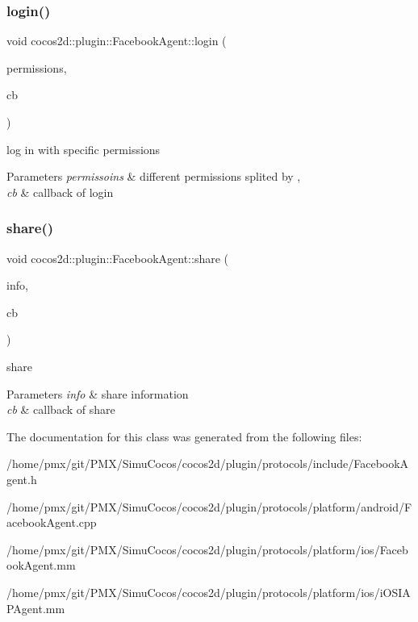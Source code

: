 \subsubsection{\texorpdfstring{login()}{login()}\hspace{0.1cm}{\footnotesize\ttfamily [2/2]}}
{\footnotesize\ttfamily void cocos2d\+::plugin\+::\+Facebook\+Agent\+::login (\begin{DoxyParamCaption}\item[{std\+::string \&}]{permissions,  }\item[{F\+B\+Callback}]{cb }\end{DoxyParamCaption})}



log in with specific permissions 


\begin{DoxyParams}{Parameters}
{\em permissoins} & different permissions splited by \textquotesingle{},\textquotesingle{} \\
\hline
{\em cb} & callback of login \\
\hline
\end{DoxyParams}
\mbox{\label{classcocos2d_1_1plugin_1_1FacebookAgent_aff75e3af70dfc31c20c32d8545cd5606}} 
\subsubsection{\texorpdfstring{share()}{share()}}
{\footnotesize\ttfamily void cocos2d\+::plugin\+::\+Facebook\+Agent\+::share (\begin{DoxyParamCaption}\item[{F\+B\+Info \&}]{info,  }\item[{F\+B\+Callback}]{cb }\end{DoxyParamCaption})}



share 


\begin{DoxyParams}{Parameters}
{\em info} & share information \\
\hline
{\em cb} & callback of share \\
\hline
\end{DoxyParams}


The documentation for this class was generated from the following files\+:\begin{DoxyCompactItemize}
\item 
/home/pmx/git/\+P\+M\+X/\+Simu\+Cocos/cocos2d/plugin/protocols/include/Facebook\+Agent.\+h\item 
/home/pmx/git/\+P\+M\+X/\+Simu\+Cocos/cocos2d/plugin/protocols/platform/android/Facebook\+Agent.\+cpp\item 
/home/pmx/git/\+P\+M\+X/\+Simu\+Cocos/cocos2d/plugin/protocols/platform/ios/Facebook\+Agent.\+mm\item 
/home/pmx/git/\+P\+M\+X/\+Simu\+Cocos/cocos2d/plugin/protocols/platform/ios/i\+O\+S\+I\+A\+P\+Agent.\+mm\end{DoxyCompactItemize}

